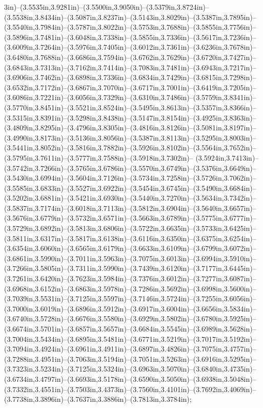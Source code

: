 3in)--(3.5535in,3.9281in)--(3.5500in,3.9050in)--(3.5379in,3.8724in)--(3.5538in,3.8434in)--(3.5087in,3.8237in)--(3.5143in,3.8029in)--(3.5387in,3.7895in)--(3.5540in,3.7984in)--(3.5787in,3.8022in)--(3.5753in,3.7688in)--(3.5855in,3.7756in)--(3.5896in,3.7481in)--(3.6048in,3.7338in)--(3.5855in,3.7336in)--(3.5617in,3.7236in)--(3.6009in,3.7264in)--(3.5976in,3.7405in)--(3.6012in,3.7361in)--(3.6236in,3.7678in)--(3.6480in,3.7688in)--(3.6686in,3.7594in)--(3.6762in,3.7629in)--(3.6720in,3.7427in)--(3.6843in,3.7313in)--(3.7162in,3.7414in)--(3.7083in,3.7481in)--(3.6943in,3.7217in)--(3.6906in,3.7462in)--(3.6898in,3.7336in)--(3.6834in,3.7429in)--(3.6815in,3.7298in)--(3.6532in,3.7172in)--(3.6867in,3.7070in)--(3.6717in,3.7001in)--(3.6419in,3.7205in)--(3.6086in,3.7221in)--(3.6056in,3.7329in)--(3.6310in,3.7486in)--(3.5759in,3.8341in)--(3.5770in,3.8451in)--(3.5521in,3.8524in)--(3.5495in,3.8613in)--(3.5357in,3.8366in)--(3.5315in,3.8391in)--(3.5298in,3.8438in)--(3.5147in,3.8154in)--(3.4925in,3.8363in)--(3.4809in,3.8295in)--(3.4796in,3.8305in)--(3.4816in,3.8126in)--(3.5081in,3.8197in)--(3.4990in,3.8173in)--(3.5136in,3.8056in)--(3.5387in,3.8113in)--(3.5295in,3.8003in)--(3.5441in,3.8052in)--(3.5816in,3.7882in)--(3.5926in,3.8102in)--(3.5564in,3.7652in)--(3.5795in,3.7611in)--(3.5777in,3.7588in)--(3.5918in,3.7302in)--
(3.5924in,3.7413in)--(3.5742in,3.7266in)--(3.5765in,3.6786in)--(3.5570in,3.6749in)--(3.5376in,3.6649in)--(3.5430in,3.6994in)--(3.5604in,3.7126in)--(3.5734in,3.7258in)--(3.5726in,3.7062in)--(3.5585in,3.6833in)--(3.5527in,3.6922in)--(3.5454in,3.6745in)--(3.5490in,3.6684in)--(3.5202in,3.6881in)--(3.5421in,3.6930in)--(3.5440in,3.7270in)--(3.5634in,3.7342in)--(3.5837in,3.7174in)--(3.6018in,3.7113in)--(3.5812in,3.6904in)--(3.5640in,3.6657in)--(3.5676in,3.6779in)--(3.5732in,3.6571in)--(3.5663in,3.6789in)--(3.5775in,3.6777in)--(3.5729in,3.6892in)--(3.5813in,3.6806in)--(3.5722in,3.6635in)--(3.5733in,3.6425in)--(3.5811in,3.6317in)--(3.5817in,3.6138in)--(3.6116in,3.6350in)--(3.6375in,3.6254in)--(3.6354in,3.6060in)--(3.6565in,3.6179in)--(3.6633in,3.6109in)--(3.6799in,3.6072in)--(3.6861in,3.5990in)--(3.7011in,3.5963in)--(3.7075in,3.6013in)--(3.6994in,3.5910in)--(3.7266in,3.5805in)--(3.7311in,3.5990in)--(3.7439in,3.6120in)--(3.7177in,3.6445in)--(3.7261in,3.6420in)--(3.7623in,3.5984in)--(3.7376in,3.6012in)--(3.7277in,3.6087in)--(3.6968in,3.6152in)--(3.6863in,3.5978in)--(3.7286in,3.5692in)--(3.6998in,3.5600in)--(3.7039in,3.5531in)--(3.7125in,3.5597in)--(3.7146in,3.5724in)--(3.7255in,3.6056in)--(3.7000in,3.6019in)--(3.6896in,3.5912in)--(3.6917in,3.6004in)--(3.6656in,3.5834in)--(3.6740in,3.5728in)--(3.6676in,3.5580in)--(3.6929in,3.5802in)--(3.6780in,3.5925in)--(3.6674in,3.5701in)--(3.6857in,3.5657in)--(3.6684in,3.5545in)--(3.6989in,3.5628in)--(3.7004in,3.5434in)--(3.6895in,3.5481in)--(3.6771in,3.5219in)--(3.7017in,3.5192in)--(3.7094in,3.4924in)--(3.6961in,3.4911in)--(3.6897in,3.4826in)--(3.7075in,3.4757in)--(3.7288in,3.4951in)--(3.7063in,3.5194in)--(3.7051in,3.5263in)--(3.6916in,3.5295in)--(3.7323in,3.5234in)--(3.7125in,3.5324in)--(3.6963in,3.5070in)--(3.6840in,3.4735in)--(3.6734in,3.4797in)--(3.6693in,3.5178in)--(3.6590in,3.5050in)--(3.6938in,3.5048in)--(3.7332in,3.4551in)--(3.7503in,3.4373in)--(3.7560in,3.4101in)--(3.7692in,3.4069in)--(3.7738in,3.3896in)--(3.7637in,3.3886in)--(3.7813in,3.3784in);
